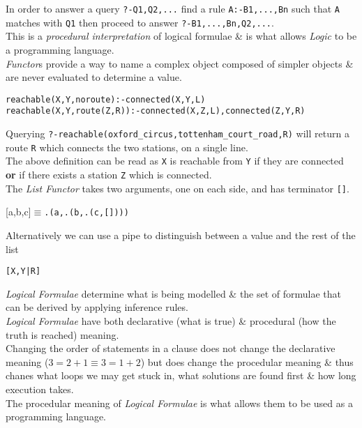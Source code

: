 \documentclass[11pt,a4paper]{article}
\begin{document}
In order to answer a query \lstinline!?-Q1,Q2,...! find a rule \lstinline!A:-B1,...,Bn! such that \lstinline!A! matches with \lstinline!Q1! then proceed to answer \lstinline!?-B1,...,Bn,Q2,...!.\\
This is a \textit{procedural interpretation} of logical formulae \& is what allows \textit{Logic} to be a programming language.\\

\textit{Functor}s provide a way to name a complex object composed of simpler objects \& are never evaluated to determine a value.
\begin{lstlisting}
reachable(X,Y,noroute):-connected(X,Y,L)
reachable(X,Y,route(Z,R)):-connected(X,Z,L),connected(Z,Y,R)
\end{lstlisting}
Querying \lstinline!?-reachable(oxford_circus,tottenham_court_road,R)! will return a route \lstinline!R! which connects the two stations, on a single line.\\
The above definition can be read as \lstinline!X! is reachable from \lstinline!Y! if they are connected \textbf{or} if there exists a station \lstinline!Z! which is connected.\\

The \textit{List Functor} takes two arguments, one on each side, and has terminator \lstinline![]!.
\begin{center}
[a,b,c]$\equiv$\lstinline!.(a,.(b,.(c,[])))!
\end{center}
Alternatively we can use a pipe to distinguish between a value and the rest of the list
\begin{center}
\lstinline![X,Y|R]!
\end{center}

\textit{Logical Formulae} determine what is being modelled \& the set of formulae that can be derived by applying inference rules.\\
\ie \textit{Logical Formulae} have both declarative (what is true) \& procedural (how the truth is reached) meaning.\\
Changing the order of statements in a clause does not change the declarative meaning ($3=2+1\equiv3=1+2$) but does change the procedular meaning \& thus chanes what loops we may get stuck in, what solutions are found first \& how long execution takes.\\
\nb The procedular meaning of \textit{Logical Formulae} is what allows them to be used as a programming language.
\end{document}
